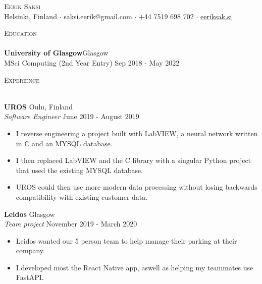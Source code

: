 \documentclass[a4paper]{article}
\newcommand{\lineunder} {
    \vspace*{-8pt} \\
    \hspace*{-18pt} \hrulefill \\
}
\newcommand{\header} [1] {
    {\hspace*{-18pt}\vspace*{6pt} \textsc{#1}}
    \vspace*{-6pt} \lineunder
}
\begin{document}
\vspace*{-40pt}

    

\vspace*{-10pt}
\begin{center}
	{\Huge \scshape {Eerik Saksi}}\\
  Helsinki, Finland $\cdot$ saksi.eerik@gmail.com $\cdot$ +44 7519 698 702 $\cdot$ \url{eeriksak.si}  \\
\end{center}

\header{Education}
\textbf{University of Glasgow}\hfill Glasgow\\
    MSci Computing (2nd Year Entry) \hfill Sep 2018 - May 2022\\
\vspace{2mm}

\header{Experience}
\vspace{1mm}

\textbf{UROS} \hfill Oulu, Finland\\
\textit{Software Engineer} \hfill June 2019 - August 2019\\
\vspace{-1mm}
\begin{itemize} \itemsep 1pt
	\item I reverse engineering a project built with LabVIEW, a neural network written in C and an MYSQL database.
  \item I then replaced LabVIEW and the C library with a singular Python project that used the existing MYSQL database.
  \item UROS could then use more modern data processing without losing backwards compatibility with existing customer data.

\end{itemize}
\textbf{Leidos} \hfill Glasgow\\
\textit{Team project} \hfill November 2019 - March 2020\\
\vspace{-1mm}
\begin{itemize} \itemsep 1pt
	\item Leidos wanted our 5 person team to help manage their parking at their company.
  \item I developed most the React Native app, aswell as helping my teammates use FastAPI.
\end{itemize}
\end{document}
